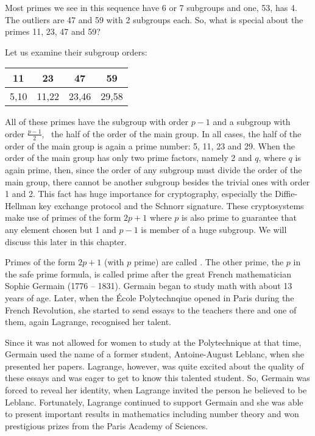 \documentclass{scrreprt}
\begin{document}
Most primes we see in this sequence have
6 or 7 subgroups and one, 53, has 4.
The outliers are 47 and 59 with 2 subgroups each.
So, what is special about the primes
11, 23, 47 and 59?

Let us examine their subgroup orders:

\begin{tabular}{c|c|c|c}
  11 & 23    &    47 &    59 \\\hline
5,10 & 11,22 & 23,46 & 29,58 
\end{tabular}

All of these primes have
the subgroup with order $p-1$ and a
subgroup with order $\frac{p-1}{2}$,
\ie\ the half of the order of the main group.
In all cases, the half of the order 
of the main group is again a prime number:
5, 11, 23 and 29.
When the order of the main group
has only two prime factors,
namely 2 and $q$, where $q$ is again prime,
then, since the order of any subgroup must 
divide the order of the main group,
there cannot be another subgroup
besides the trivial ones with order 1 and 2.
This fact has huge importance
for cryptography, especially the 
Diffie-Hellman key exchange protocol
and the Schnorr signature.
These cryptosystems make use of 
primes of the form $2p+1$ where $p$ is also prime
to guarantee that any element chosen
but 1 and $p-1$ is member of a huge 
subgroup. We will discuss this later in this chapter.

Primes of the form $2p+1$ (with $p$ prime) are
called .
The other prime, the $p$ in the safe prime formula,
is called  prime
after the great French mathematician 
Sophie Germain (1776 -- 1831).
Germain began to study math with about 13 years of age.
Later, when the École Polytechnqiue opened in Paris
during the French Revolution,
she started to send essays 
to the teachers there and one of them,
again Lagrange, 
recognised her talent.

Since it was not allowed for women to study at the Polytechnique
at that time, Germain used the name of a former student,
Antoine-August Leblanc, when she presented her papers.
Lagrange, however, was quite excited about the quality of these essays
and was eager to get to know this talented student.
So, Germain was forced to reveal her identity,
when Lagrange invited the person
he believed to be Leblanc.
Fortunately, Lagrange continued to support Germain
and she was able to present important results
in mathematics including number theory and won prestigious prizes
from the Paris Academy of Sciences.
\end{document}
